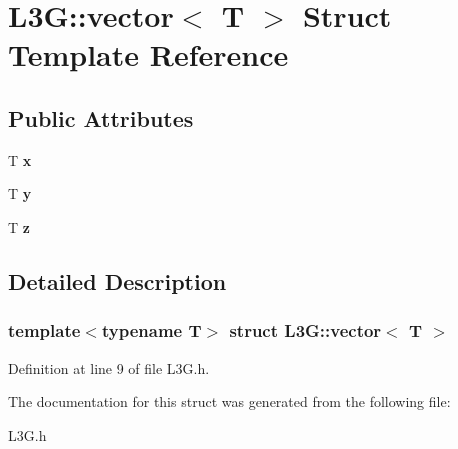 \hypertarget{struct_l3_g_1_1vector}{}\section{L3G\+:\+:vector$<$ T $>$ Struct Template Reference}
\label{struct_l3_g_1_1vector}
\subsection*{Public Attributes}
\begin{DoxyCompactItemize}
\item 
\mbox{\label{struct_l3_g_1_1vector_a8fa9fd1cc2c5e23ea89c01efa840dd89}} 
T {\bfseries x}
\item 
\mbox{\label{struct_l3_g_1_1vector_a938a17269c3aceb61e5bc42e3d557b00}} 
T {\bfseries y}
\item 
\mbox{\label{struct_l3_g_1_1vector_a37769782008be4b3e690ff3b7bf6fabf}} 
T {\bfseries z}
\end{DoxyCompactItemize}


\subsection{Detailed Description}
\subsubsection*{template$<$typename T$>$\newline
struct L3\+G\+::vector$<$ T $>$}



Definition at line 9 of file L3\+G.\+h.



The documentation for this struct was generated from the following file\+:\begin{DoxyCompactItemize}
\item 
L3\+G.\+h\end{DoxyCompactItemize}
